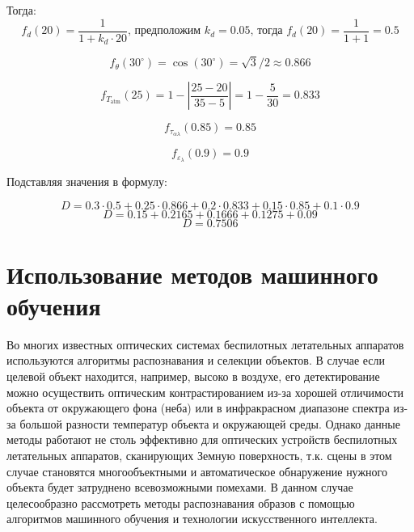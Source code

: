 Тогда:
\[f_d(20) = \frac{1}{1 + k_d \cdot 20} \text{, предположим } k_d = 0.05 \text{, тогда } f_d(20) = \frac{1}{1 + 1} = 0.5 \]

\[f_\theta(30^\circ) = \cos(30^\circ) = \sqrt{3}/2 \approx 0.866\] 

\[f_{T_{\text{atm}}}(25) = 1 - \left| \frac{25 - 20}{35 - 5} \right| = 1 - \frac{5}{30} = 0.833\]

\[f_{\tau_{\alpha \lambda}}(0.85) = 0.85\] 

\[f_{\varepsilon_\lambda}(0.9) = 0.9\] 

Подставляя значения в формулу:

\[ D = 0.3 \cdot 0.5 + 0.25 \cdot 0.866 + 0.2 \cdot 0.833 + 0.15 \cdot 0.85 + 0.1 \cdot 0.9 \]
\[ D = 0.15 + 0.2165 + 0.1666 + 0.1275 + 0.09 \]
\[ D = 0.7506 \]

\section{Использование методов машинного обучения}
Во многих известных оптических системах беспилотных летательных аппаратов используются алгоритмы распознавания и селекции объектов. В случае если целевой объект находится, например, высоко в воздухе, его детектирование можно осуществить оптическим контрастированием из-за хорошей отличимости объекта от окружающего фона (неба) или в инфракрасном диапазоне спектра из-за большой разности температур объекта и окружающей среды. Однако данные методы работают не столь эффективно для оптических устройств беспилотных летательных аппаратов, сканирующих Земную поверхность, т.к. сцены в этом случае становятся многообъектными и автоматическое обнаружение нужного объекта будет затруднено всевозможными помехами. В данном случае целесообразно рассмотреть методы распознавания образов с помощью алгоритмов машинного обучения и технологии искусственного интеллекта.

